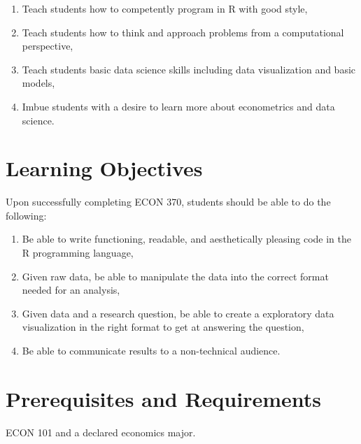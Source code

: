 \documentclass[11pt]{article}
\newcommand{\CourseNum}{370\xspace}         %
\begin{document}
\begin{enumerate}
    \item Teach students how to competently program in R with good style,
    \item Teach students how to think and approach problems from a computational perspective,
    \item Teach students basic data science skills including data visualization and basic models,
    \item Imbue students with a desire to learn more about econometrics and data science.
\end{enumerate}


\section*{Learning Objectives}
Upon successfully completing ECON \CourseNum, students should be able to do the following:

\begin{enumerate}
    \item Be able to write functioning, readable, and aesthetically pleasing code in the R programming language, 
    \item Given raw data, be able to manipulate the data into the correct format needed for an analysis,
    \item Given data and a research question, be able to create a exploratory data visualization in the right format to get at answering the question,
    \item Be able to communicate results to a non-technical audience.
\end{enumerate}


\section*{Prerequisites and Requirements}
ECON 101 and a declared economics major.

\end{document}
